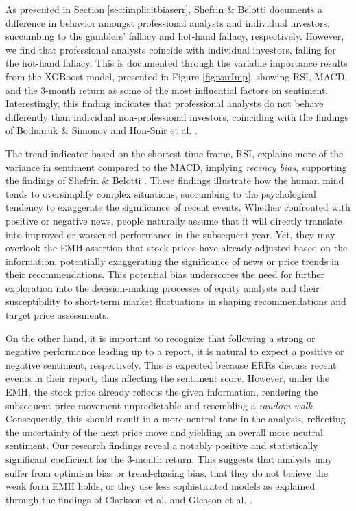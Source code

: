As presented in Section \ref{sec:implicitbiaserr}, Shefrin \& Belotti \parencite*{shefrin2007behavioral} documents a difference in behavior amongst professional analysts and individual investors, succumbing to the gamblers' fallacy and hot-hand fallacy, respectively. However, we find that professional analysts coincide with individual investors, falling for the hot-hand fallacy. This is documented through the variable importance results from the XGBoost model, presented in Figure \ref{fig:varImp}, showing RSI, MACD, and the 3-month return as some of the most influential factors on sentiment. Interestingly, this finding indicates that professional analysts do not behave differently than individual non-professional investors, coinciding with the findings of Bodnaruk \& Simonov \parencite*{bodnaruk2015financial} and Hon-Snir et al. \parencite*{hon2012stock}. 


The trend indicator based on the shortest time frame, RSI, explains more of the variance in sentiment compared to the MACD, implying \textit{recency bias}, supporting the findings of Shefrin \& Belotti \parencite*{shefrin2007behavioral}. These findings illustrate how the human mind tends to oversimplify complex situations, succumbing to the psychological tendency to exaggerate the significance of recent events. Whether confronted with positive or negative news, people naturally assume that it will directly translate into improved or worsened performance in the subsequent year. Yet, they may overlook the EMH assertion that stock prices have already adjusted based on the information, potentially exaggerating the significance of news or price trends in their recommendations. This potential bias underscores the need for further exploration into the decision-making processes of equity analysts and their susceptibility to short-term market fluctuations in shaping recommendations and target price assessments.

On the other hand, it is important to recognize that following a strong or negative performance leading up to a report, it is natural to expect a positive or negative sentiment, respectively. This is expected because ERRs discuss recent events in their report, thus affecting the sentiment score. However, under the EMH, the stock price already reflects the given information, rendering the subsequent price movement unpredictable and resembling a \textit{random walk}. Consequently, this should result in a more neutral tone in the analysis, reflecting the uncertainty of the next price move and yielding an overall more neutral sentiment. Our research findings reveal a notably positive and statistically significant coefficient for the 3-month return. This suggests that analysts may suffer from optimism bias or trend-chasing bias, that they do not believe the weak form EMH holds, or they use less sophisticated models as explained through the findings of Clarkson et al. \parencite*{clarkson2015target} and Gleason et al. \parencite*{gleason2013valuation}.

